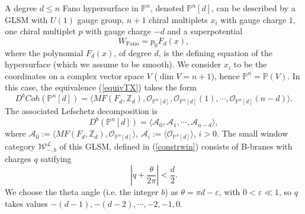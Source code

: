 \documentclass[a4paper,11pt]{article}
\def\cO{\mathcal{O}}
\def\cA{\mathcal{A}}
\newcommand{\bP}{{\mathbb{P}}}
\numberwithin{equation}{section}
\begin{document}
A degree $d\leq n$ Fano hypersurface in $\bP^n$, denoted $\mathbb{P}^{n}[d]$, 
can be described by a GLSM with $U(1)$ gauge group, $n+1$ chiral 
multiplets $x_i$ with gauge charge $1$, one chiral multiplet $p$ with gauge 
charge $-d$ and a superpotential
\begin{equation}
W_{\mathrm{Fano}} = p_0 F_{d}(x),
\end{equation}
where the polynomial $F_{d}(x)$, of degree $d$, is the defining equation 
of the hypersurface (which we assume to be smooth). We consider $x_{i}$ to be 
the 
coordinates on a complex vector space $V$ ($\dim 
V=n+1$), hence $\bP^n=\mathbb{P}(V)$. In this case, the equivalence 
(\ref{equivTX}) takes the form
\begin{equation}
D^bCoh(\bP^n[d]) = \langle 
MF(F_{d},\mathbb{Z}_{d}),\cO_{\mathbb{P}^{n}[d]},\cO_{\mathbb{P}^{n}[d]}(1),
\cdots,\cO_{\mathbb{P}^{n}[d]}(n-d) \rangle. 
\end{equation}
The associated Lefschetz decomposition is
\begin{equation}\label{LDpd}
D^b(\bP^n[d]) = \langle \cA_0,\cA_1,\cdots,\cA_{n-d} \rangle,
\end{equation}
where $\cA_0 := \langle MF(F_{d},\mathbb{Z}_{d}),\cO_{\mathbb{P}^{n}[d]} 
\rangle$, $\cA_i := \langle \cO_{\mathbb{P}^{n}[d]} \rangle$, $i>0$.
The small window category $\mathcal{W}^{\mathcal{L}}_{-,b}$ of this GLSM, 
defined in (\ref{constrwin}) consists of B-branes with charges $q$ 
satifying
\begin{equation}\label{chargescondt}
\left| q + \frac{\theta}{2 \pi} \right| < \frac{d}{2}.
\end{equation}
We choose the theta angle (i.e. the integer $b$) as $\theta=\pi d-\varepsilon$, 
with $0<\varepsilon\ll 1$, so $q$ takes values 
$-(d-1),-(d-2),\cdots,-2,-1,0$.
\end{document}
